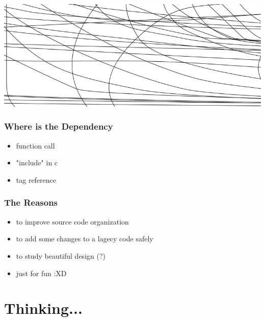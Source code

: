 
\begin{frame}[plain]
	\begin{center}
		\includegraphics[scale=0.4]{gcin-2-6-5-2.png}
	\end{center}
\end{frame}


\begin{frame}[t]
	\frametitle{Where is the Dependency}
	\begin{itemize}
		\item<+-|alert@+> function call
		\item<+-|alert@+> "include" in c
		\item<+-|alert@+> tag reference
	\end{itemize}
\end{frame}


\begin{frame}[t]
	\frametitle{The Reasons}
	\begin{itemize}
		\item<+-|alert@+> to improve source code organization
		\item<+-|alert@+> to add some changes to a lagecy code safely
		\item<+-|alert@+> to study beautiful design (?)
		\item<+-|alert@+> just for fun :XD
	\end{itemize}
\end{frame}


\section{Thinking...}


